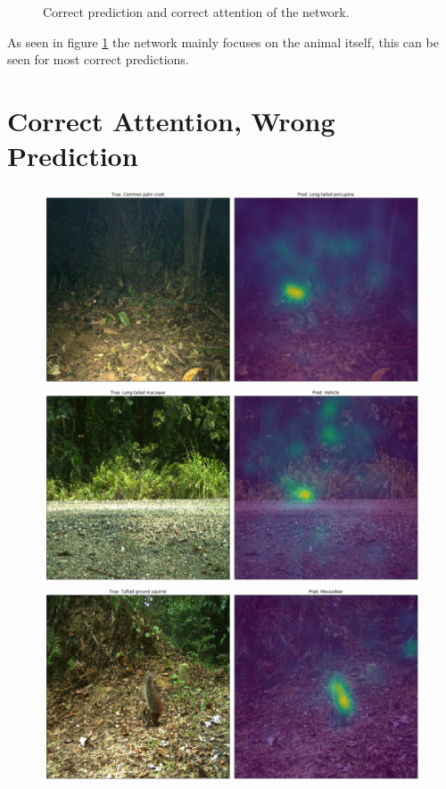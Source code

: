 \documentclass[journal, a4paper]{IEEEtran}
\begin{document}
\begin{figure}[!hbt]
\begin{center}
		\caption{Correct prediction and correct attention of the network.}
		\label{fig:correct_correct}
		\end{center}
	\end{figure}

As seen in figure \ref{fig:correct_correct}  the network mainly focuses on the animal itself, this can be seen for most correct predictions. 

\section{Correct Attention, Wrong  Prediction}
	\begin{figure}[!hbt]
		\begin{center}
		\includegraphics[width=\columnwidth]{images/Attention_wrong.png}
		\includegraphics[width=\columnwidth]{images/Attention_wrong3.png}
		\includegraphics[width=\columnwidth]{images/Attention_wrong4.png}

\end{center}
\end{figure}
\end{document}
